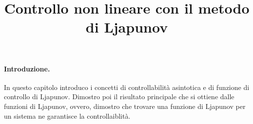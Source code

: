 \title{Controllo non lineare con il metodo di Ljapunov}

\maketitle
\label{sec:nonlinear-control}


\paragraph{Introduzione.}

In questo capitolo introduco i concetti di
controllabilità asintotica e di funzione di controllo di
Ljapunov.
Dimostro poi il risultato principale
che si ottiene dalle funzioni di Ljapunov, ovvero,
dimostro che trovare una funzione di Ljapunov per un sistema
ne garantisce la controllaiblità.



